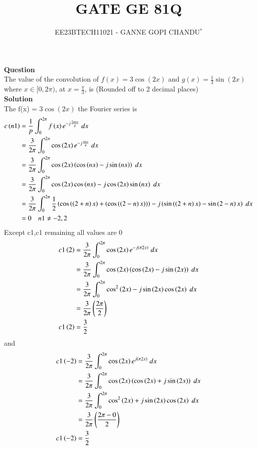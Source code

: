 \documentclass[journal,12pt,onecolumn]{IEEEtran}
\theoremstyle{remark}
\begin{document}

\vspace{3cm}
\title{GATE GE 81Q}
\author{EE23BTECH11021 - GANNE GOPI CHANDU$^{*}$%
}
\maketitle
\bigskip
\renewcommand{\thefigure}{\theenumi}
\renewcommand{\thetable}{\theenumi}

\textbf{Question}\\
The value of the convolution of $f(x) = 3\cos(2x)$ and $g(x) = \frac{1}{3}\sin(2x)$ where $x \in [0, 2\pi)$, at $x = \frac{\pi}{3}$, is (Rounded off to 2 decimal places)\\
\textbf{Solution}\\

The f(x) = $3\cos(2x)$ the  Fourier series is
\begin{align}
    c\left(n1\right)&=\frac{1}{p}\int_{0}^{2\pi}f\left(x\right)e^{-j\frac{2\pi n x}{p}}\;dx \\
    &=\frac{3}{2\pi}\int_{0}^{2\pi}\cos\left(2x\right)e^{-j\frac{\pi n x}{\pi}}\;dx \\
    &=\frac{3}{2\pi}\int_{0}^{2\pi}\cos\left(2x\right)\left(\cos\left(nx\right)-j\sin\left(nx\right)\right)\;dx \\
    &=\frac{3}{2\pi}\int_{0}^{2\pi}\cos\left(2x\right)\cos\left(nx\right)-j\cos\left(2x\right)\sin\left(nx\right)\;dx \\
    &=\frac{3}{2\pi}\int_{0}^{2\pi}\frac{1}{2}\left(\cos\left(\left(2+n\right)x\right)+\left(\cos\left(\left(2-n\right)x\right)\right)\right)-j\left(\sin\left(\left(2+n\right)x\right)-\sin\left(2-n\right)x\right)\;dx \\
    &=0 \quad{n1\neq-2,2}
\end{align}
Except c1,c1 remaining all values are 0
\begin{align}
    c1\left(2\right)&=\frac{3}{2\pi}\int_{0}^{2\pi}\cos\left(2x\right)e^{-j\left(\pi 2 x\right)}\;dx \\
    &=\frac{3}{2\pi}\int_{0}^{2\pi}\cos\left(2x\right)\left(\cos\left(2x\right)-j\sin\left(2x\right)\right)\;dx \\
    &=\frac{3}{2\pi}\int_{0}^{2\pi}\cos^2\left(2x\right)-j\sin\left(2x\right)\cos\left(2x\right)\;dx \\
    &=\frac{3}{2\pi}\left(\frac{2\pi}{2}\right)\\
    c1\left(2\right)&=\frac{3}{2}
\end{align}
and
\begin{align}
    c1\left(-2\right)&=\frac{3}{2\pi}\int_{0}^{2\pi}\cos\left(2x\right)e^{j\left(\pi 2 x\right)}\;dx \\
    &=\frac{3}{2\pi}\int_{0}^{2\pi}\cos\left(2x\right)\left(\cos\left(2x\right)+j\sin\left(2x\right)\right)\;dx \\
    &=\frac{3}{2\pi}\int_{0}^{2\pi}\cos^2\left(2x\right)+j\sin\left(2x\right)\cos\left(2x\right)\;dx \\
    &=\frac{3}{2\pi}\left(\frac{2\pi-0}{2}\right)\\
    c1\left(-2\right)&=\frac{3}{2}
\end{align}
\end{document}
